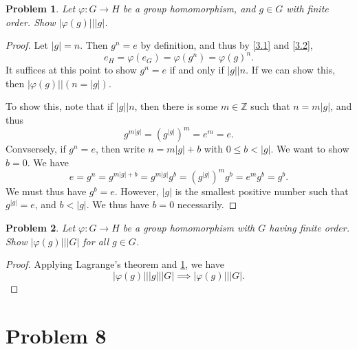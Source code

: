 \documentclass[11pt, letterpaper]{article}
\theoremstyle{plain}
\newtheorem{problem}{Problem}[section]
\begin{document}
\begin{problem}\label{3.3}
	Let $\varphi : G \to H$ be a group homomorphism, and $g\in G$ with finite order. Show $\left| \varphi (g) \right| | \left| g \right| $.
\end{problem}
\begin{proof}
Let $\left| g \right| =n$. Then $g^n=e$ by definition, and thus by \cref{3.1} and \cref{3.2},
	\[
		e_H=\varphi (e_G)=\varphi (g^n)=\varphi (g)^n
	.\]
	It suffices at this point to show $g^n = e$ if and only if $\left| g \right| |n$. If we can show this, then $\left| \varphi (g) \right| |(n=\left| g \right| )$.

	To show this, note that if $\left| g \right| |n$, then there is some $m\in\mathbb{Z} $ such that $n=m\left| g \right| $, and thus
	\[
		g^{m\left| g \right| } =\left( g^{\left| g \right| }  \right) ^m = e^m=e
	.\]
	Convsersely, if $g^n=e$, then write $n=m \left| g \right| + b$ with $0\leq b<\left| g \right| $. We want to show $b=0$. We have
	\[
		e = g^n=g^{m\left| g \right| +b} =g^{m \left| g \right| } g^b = \left( g^{\left| g \right| }  \right) ^m g^b = e^m g^b=g^b
	.\]
	We must thus have $g^b=e$. However, $\left| g \right| $ is the smallest positive number such that $g^{\left| g \right| } =e$, and $b<\left| g \right| $. We thus have $b=0$ necessarily.
\end{proof}

\begin{problem}
	Let $\varphi : G \to H$ be a group homomorphism with $G$ having finite order. Show $\left| \varphi (g) \right| |\left| G \right| $ for all $g\in G$.
\end{problem}
\begin{proof}
	Applying Lagrange's theorem and \cref{3.3}, we have
	\[
		\left| \varphi (g) \right| \big|\left| g \right| \big|\left| G \right| \implies \left| \varphi (g) \right| \big| \left| G \right| 
	.\]
\end{proof}



\section{Problem 8}
\end{document}

